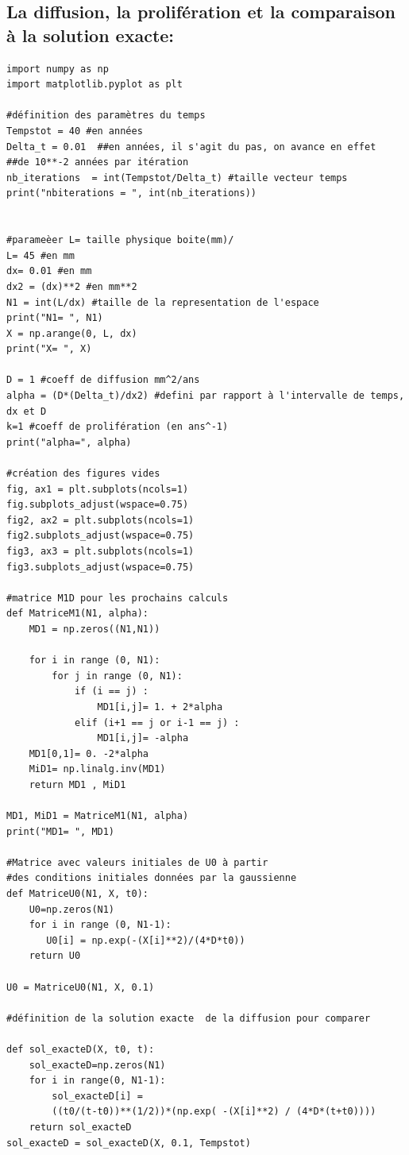 \documentclass[12pt,a4paper]{article}
\begin{document}
\subsection{La diffusion, la prolifération et la comparaison à la solution exacte:}

\begin{lstlisting}[style=stylepython]
import numpy as np
import matplotlib.pyplot as plt

#définition des paramètres du temps
Tempstot = 40 #en années 
Delta_t = 0.01  ##en années, il s'agit du pas, on avance en effet 
##de 10**-2 années par itération
nb_iterations  = int(Tempstot/Delta_t) #taille vecteur temps
print("nbiterations = ", int(nb_iterations))


#parameèer L= taille physique boite(mm)/ 
L= 45 #en mm
dx= 0.01 #en mm
dx2 = (dx)**2 #en mm**2
N1 = int(L/dx) #taille de la representation de l'espace 
print("N1= ", N1)
X = np.arange(0, L, dx)
print("X= ", X)

D = 1 #coeff de diffusion mm^2/ans
alpha = (D*(Delta_t)/dx2) #defini par rapport à l'intervalle de temps, dx et D
k=1 #coeff de prolifération (en ans^-1)
print("alpha=", alpha) 

#création des figures vides  
fig, ax1 = plt.subplots(ncols=1)
fig.subplots_adjust(wspace=0.75)
fig2, ax2 = plt.subplots(ncols=1)
fig2.subplots_adjust(wspace=0.75)
fig3, ax3 = plt.subplots(ncols=1)
fig3.subplots_adjust(wspace=0.75)

#matrice M1D pour les prochains calculs
def MatriceM1(N1, alpha): 
    MD1 = np.zeros((N1,N1))
    
    for i in range (0, N1): 
        for j in range (0, N1): 
            if (i == j) : 
                MD1[i,j]= 1. + 2*alpha
            elif (i+1 == j or i-1 == j) : 
                MD1[i,j]= -alpha
    MD1[0,1]= 0. -2*alpha
    MiD1= np.linalg.inv(MD1)           
    return MD1 , MiD1           

MD1, MiD1 = MatriceM1(N1, alpha)
print("MD1= ", MD1)

#Matrice avec valeurs initiales de U0 à partir 
#des conditions initiales données par la gaussienne
def MatriceU0(N1, X, t0): 
    U0=np.zeros(N1)
    for i in range (0, N1-1):
       U0[i] = np.exp(-(X[i]**2)/(4*D*t0))
    return U0

U0 = MatriceU0(N1, X, 0.1)

#définition de la solution exacte  de la diffusion pour comparer 

def sol_exacteD(X, t0, t):
    sol_exacteD=np.zeros(N1)
    for i in range(0, N1-1):
        sol_exacteD[i] = 
        ((t0/(t-t0))**(1/2))*(np.exp( -(X[i]**2) / (4*D*(t+t0))))
    return sol_exacteD
sol_exacteD = sol_exacteD(X, 0.1, Tempstot)


\end{lstlisting}
\end{document}

